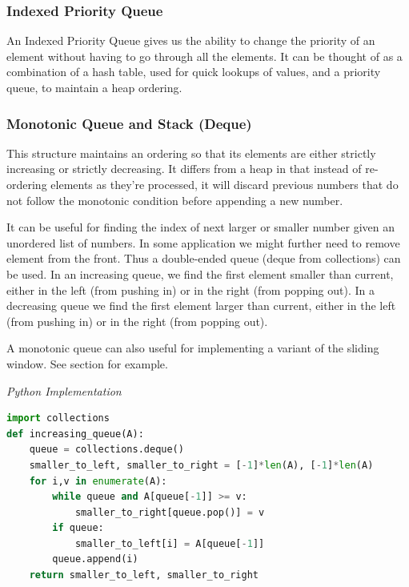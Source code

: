 \documentclass{article}
\begin{document}
    \subsubsection{Indexed Priority Queue}
    An Indexed Priority Queue gives us the ability to change the priority of an element without having to go through all the elements. It can be thought of as a combination of a hash table, used for quick lookups of values, and a priority queue, to maintain a heap ordering.

    \subsubsection{Monotonic Queue and Stack (Deque)}
    This structure maintains an ordering so that its elements are either strictly increasing or strictly decreasing. It differs from a heap in that instead of re-ordering elements as they're processed, it will discard previous numbers that do not follow the monotonic condition before appending a new number. 
    
    It can be useful for finding the index of next larger or smaller number given an unordered list of numbers. In some application we might further need to remove element from the front. Thus a double-ended queue (deque from collections) can be used. In an increasing queue, we find the first element smaller than current, either in the left (from pushing in) or in the right (from popping out). In a decreasing queue we find the first element larger than current, either in the left (from pushing in) or in the right (from popping out).
    
    A monotonic queue can also useful for implementing a variant of the sliding window. See section for example.
    
\vspace{8pt} \emph{Python Implementation}
\begin{lstlisting}[language=Python]
import collections
def increasing_queue(A):
    queue = collections.deque()
    smaller_to_left, smaller_to_right = [-1]*len(A), [-1]*len(A)
    for i,v in enumerate(A):
        while queue and A[queue[-1]] >= v: 
            smaller_to_right[queue.pop()] = v 
        if queue:  
            smaller_to_left[i] = A[queue[-1]]
        queue.append(i)
    return smaller_to_left, smaller_to_right
\end{lstlisting}
\end{document}
